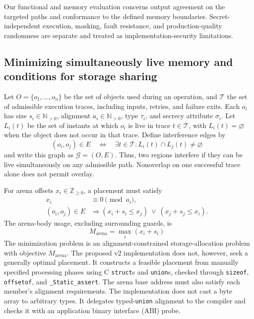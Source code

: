 \documentclass[a4paper,10pt]{article}
\theoremstyle{definition}
\theoremstyle{remark}
\begin{document}
Our functional and memory evaluation concerns output agreement on the targeted paths and conformance to the defined memory boundaries. Secret-independent execution, masking, fault resistance, and production-quality randomness are separate and treated as implementation-security limitations.

\subsection{Minimizing simultaneously live memory and conditions for storage sharing}
\label{sec:formulation}

Let $O=\{o_1,\ldots,o_n\}$ be the set of objects used during an operation, and $\mathcal{T}$ the set of admissible execution traces, including inputs, retries, and failure exits. Each $o_i$ has size $s_i\in\mathbb{N}_{>0}$, alignment $a_i\in\mathbb{N}_{>0}$, type $\tau_i$, and secrecy attribute $\sigma_i$. Let $L_i(t)$ be the set of instants at which $o_i$ is live in trace $t\in\mathcal{T}$, with $L_i(t)=\varnothing$ when the object does not occur in that trace. Define interference edges by
\begin{equation}
  (o_i,o_j)\in E
  \quad\Longleftrightarrow\quad
  \exists t\in\mathcal{T}:L_i(t)\cap L_j(t)\neq\varnothing
  \label{eq:interference}
\end{equation}
and write this graph as $\mathcal{G}=(O,E)$. Thus, two regions interfere if they can be live simultaneously on any admissible path. Nonoverlap on one successful trace alone does not permit overlay.

For arena offsets $x_i\in\mathbb{Z}_{\geq 0}$, a placement must satisfy
\begin{align}
  x_i &\equiv 0 \pmod{a_i}, \\
  (o_i,o_j)\in E
  &\Longrightarrow
  (x_i+s_i\leq x_j)\ \lor\ (x_j+s_j\leq x_i).
  \label{eq:nonoverlap}
\end{align}
The arena-body usage, excluding surrounding guards, is
\begin{equation}
  M_{\mathrm{arena}}=\max_i(x_i+s_i)
  \label{eq:arena-height}
\end{equation}
The minimization problem is an alignment-constrained storage-allocation problem with objective $M_{\mathrm{arena}}$. The proposed v2 implementation does not, however, seek a generally optimal placement. It constructs a feasible placement from manually specified processing phases using C \texttt{struct}s and \texttt{union}s, checked through \texttt{sizeof}, \texttt{offsetof}, and \texttt{\_Static\_assert}.
The arena base address must also satisfy each member's alignment requirements. The implementation does not cast a byte array to arbitrary types. It delegates typed-\texttt{union} alignment to the compiler and checks it with an application binary interface (ABI) probe.
\end{document}
